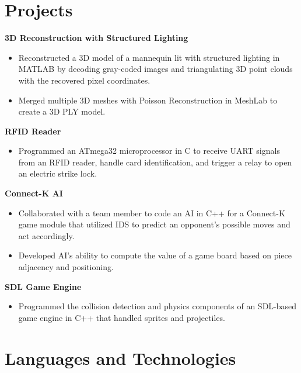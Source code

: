 \documentclass[10pt, letterpaper, sans]{moderncv} %
\begin{document}
\section{Projects}
\textbf{3D Reconstruction with Structured Lighting}
\begin{itemize}
\item Reconstructed a 3D model of a mannequin lit with structured lighting in MATLAB by decoding gray-coded images and triangulating 3D point clouds with the recovered pixel coordinates.
\item Merged multiple 3D meshes with Poisson Reconstruction in MeshLab to create a 3D PLY model.
\end{itemize}

\textbf{RFID Reader}
\begin{itemize}
\item Programmed an ATmega32 microprocessor in C to receive UART signals from an RFID reader, handle card identification, and trigger a relay to open an electric strike lock.
\end{itemize}

\textbf{Connect-K AI}
\begin{itemize}
\item Collaborated with a team member to code an AI in C++ for a Connect-K game module that utilized IDS to predict an opponent's possible moves and act accordingly.
\item Developed AI's ability to compute the value of a game board based on piece adjacency and positioning.
\end{itemize}

\textbf{SDL Game Engine}
\begin{itemize}
\item Programmed the collision detection and physics components of an SDL-based game engine in C++ that handled sprites and projectiles.
\end{itemize}

\section{Languages and Technologies}
\end{document}
